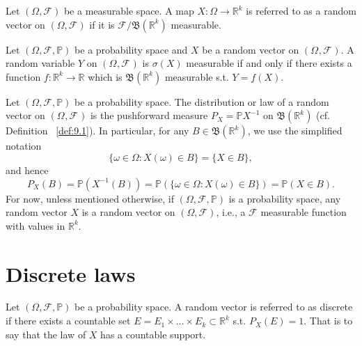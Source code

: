 \begin{definition}
    \label{def:10.3}
    Let $(\Omega, \mathcal{F})$ be a measurable space. A map $X: \Omega \to \mathbb{R}^{k}$ 
    is referred to as a random vector on $(\Omega, \mathcal{F})$ if it is
    $\mathcal{F}/\mathfrak{B}(\mathbb{R}^{k})$ measurable.
\end{definition}

\begin{proposition}[]
    \label{prop:10.1}
    Let $(\Omega, \mathcal{F}, \mathbb{P})$ be a probability space and $X$ be a random
    vector on $(\Omega^{ }, \mathcal{F}^{})$. A random variable $Y$ on $(\Omega^{ }, \mathcal{F}^{ })$
    is $\sigma(X)$ measurable if and only if there exists a function
    $f: \mathbb{R}^{k} \to \mathbb{R}$ which is $\mathfrak{B}(\mathbb{R}^{k})$ measurable s.t.
    $Y = f(X)$.
\end{proposition}

\begin{definition}[]
    \label{def:10.4}
    Let $(\Omega, \mathcal{F}, \mathbb{P})$ be a probability space. The distribution or law of
    a random vector on $(\Omega^{ }, \mathcal{F}^{ })$ is the pushforward measure
    $P_X = \mathbb{P} X^{-1}$ on $\mathfrak{B}(\mathbb{R}^{k})$ (cf. Definition ~\ref{def:9.1}).
    In particular, for any $B \in \mathfrak{B}(\mathbb{R}^{k})$, we use the simplified notation
    \[
    \{\omega \in \Omega: X(\omega) \in B\} = \{X \in B\} 
    ,\] 
    and hence
    \[
    P_X(B) = \mathbb{P}(X^{-1}(B)) = \mathbb{P}(\{\omega \in \Omega: X(\omega) \in B\} ) =
    \mathbb{P}(X \in B)
    .\] 
    For now, unless mentioned otherwise, if $ (\Omega, \mathcal{F}, \mathbb{P})$ is a probability
    space, any random vector $X$ is a random vector on $(\Omega, \mathcal{F})$, i.e., a $\mathcal{F}$ 
    measurable function with values in $\mathbb{R}^{k}$.
\end{definition}

\section{Discrete laws}%
\label{sec:Discrete laws}
\begin{definition}
    \label{def:10.5}
    Let $(\Omega, \mathcal{F}, \mathbb{P})$ be a probability space. A random vector is referred to as
    discrete if there exists a countable set $E = E_1 \times \ldots \times E_k \subset \mathbb{R}^{k}$ 
    s.t. $P_X(E)=1$. That is to say that the law of $X$ has a countable support.
\end{definition}

